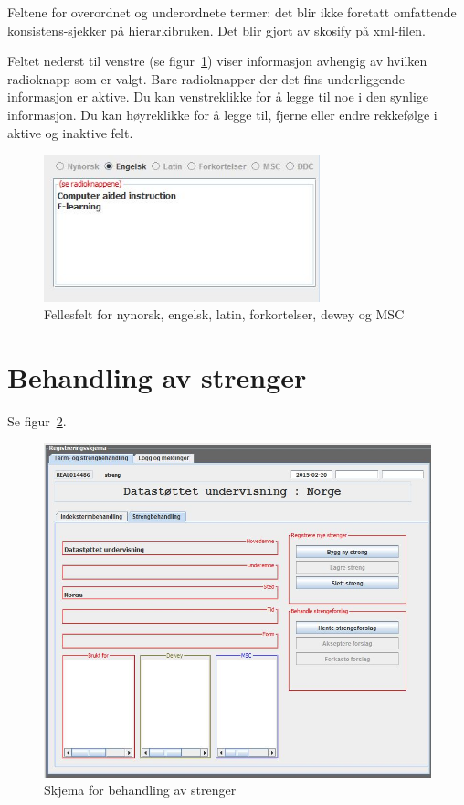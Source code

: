\documentclass[a4paper,norsk,11pt]{article}
\begin{document}
Feltene for overordnet og underordnete termer: det blir ikke foretatt omfattende konsistens-sjekker på hierarkibruken. Det blir gjort av skosify på xml-filen.

Feltet nederst til venstre (se figur~\ref{nynorskmm}) viser informasjon avhengig av hvilken radioknapp som er valgt. Bare radioknapper der det fins underliggende informasjon er aktive. Du kan venstreklikke for å legge til noe i den synlige informasjon. Du kan høyreklikke for å legge til, fjerne eller endre rekkefølge i aktive og inaktive felt.

\begin{figure}
\begin{center}
\includegraphics[width=8cm]{./nynorskmm.JPG}
\caption{Fellesfelt for nynorsk, engelsk, latin, forkortelser, dewey og MSC}\label{nynorskmm}
\end{center}
\end{figure}

\section{Behandling av strenger}
Se figur~\ref{strengskjema}.
\begin{figure}
\begin{center}
\includegraphics[width=\textwidth]{./strengskjema.JPG}
\caption{Skjema for behandling av strenger}\label{strengskjema}
\end{center}
\end{figure}
\end{document}
